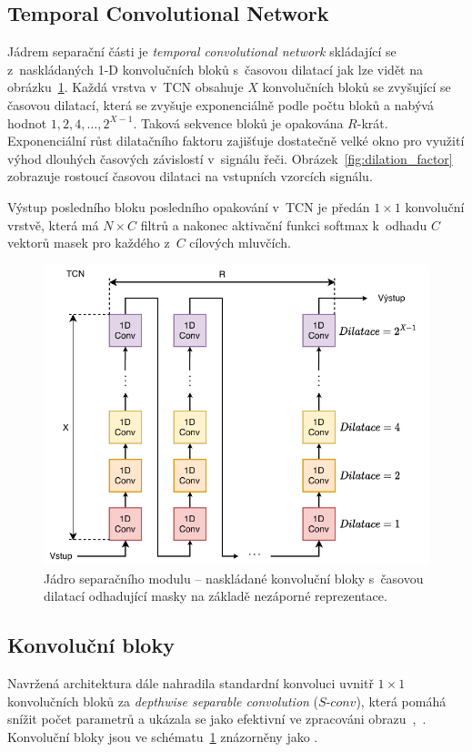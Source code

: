 \subsection{Temporal Convolutional Network}
Jádrem separační části je \textit{temporal convolutional network} skládající se z~naskládaných  1-D konvolučních bloků s~časovou dilatací jak lze vidět na obrázku~\ref{fig:tasnet-stacked-resblocks}. Každá vrstva v~TCN obsahuje $X$ konvolučních bloků se zvyšující se časovou dilatací, která se zvyšuje exponenciálně podle počtu bloků a nabývá hodnot $1, 2, 4, \dots, 2^{X-1}$. Taková sekvence bloků je opakována $R$-krát. Exponenciální růst dilatačního faktoru zajišťuje dostatečně velké okno pro využití výhod dlouhých časových závislostí v~signálu řeči. Obrázek~\ref{fig:dilation_factor} zobrazuje rostoucí časovou dilataci na vstupních vzorcích signálu.

Výstup posledního bloku posledního opakování v~TCN je předán $1 \times 1$ konvoluční vrstvě, která má $N \times C$ filtrů a nakonec aktivační funkci softmax k~odhadu $C$ vektorů masek pro každého z~$C$ cílových mluvčích.


\begin{figure}[H]
    \centering
    \includegraphics[scale=0.9]{obrazky-figures/stacked_resblocks.pdf}
    \caption{\label{fig:tasnet-stacked-resblocks}Jádro separačního modulu -- naskládané konvoluční bloky s~časovou dilatací odhadující masky na základě nezáporné reprezentace.}
\end{figure}



\subsection{Konvoluční bloky}
Navržená architektura dále nahradila standardní konvoluci uvnitř $1 \times 1$ konvolučních bloků za \textit{depthwise separable convolution} ($S\texttt{-}conv$), která pomáhá snížit počet parametrů a ukázala se jako efektivní ve zpracováni obrazu~\cite{Chollet_2017_CVPR},~\cite{MobileNets}. Konvoluční bloky jsou ve schématu~\ref{fig:tasnet-stacked-resblocks} znázorněny jako .

